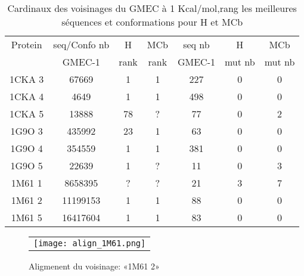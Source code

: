     \begin{table}[h]
      \centering

      \begin{tabular}{ccccccc}


        \toprule
        Protein & seq/Confo nb  & H      & MCb   & seq nb  & H  & MCb  \\
                &     GMEC-1    &  rank &  rank & GMEC-1  & mut nb & mut nb \\
        \cmidrule{1-7}
        1CKA 3 & 67669    & 1  & 1 & 227  & 0 & 0 \\
        1CKA 4 & 4649     & 1  & 1 & 498  & 0 & 0 \\
        1CKA 5 & 13888    & 78 & ? & 77   & 0 & 2 \\
        1G9O 3 & 435992   & 23 & 1 & 63   & 0 & 0 \\
        1G9O 4 & 354559   & 1  & 1 & 381  & 0 & 0 \\
        1G9O 5 & 22639    & 1  & ? &  11  & 0 & 3 \\
        1M61 1 & 8658395  & ?  & ? & 21   & 3 & 7 \\
        1M61 2 & 11199153 & 1  & 1 & 88   & 0 & 0 \\
        1M61 5 & 16417604 & 1  & 1 & 83   & 0 & 0 \\
        \bottomrule
      \end{tabular} 
 \caption{Cardinaux  des voisinages du GMEC à 1 Kcal/mol,rang les meilleures séquences et conformations pour H et MCb}
\label{tab:etude_au_voisinnage}           
\end{table}

    \begin{figure}[h]
      \centering
      \begin{tabular}{c} 
        \texttt{[image: align\_1M61.png]} 
      \end{tabular}
      
      \caption{Aligmenent du voisinage: «1M61 2»}
\label{image:Align_Suboptimal}
    \end{figure}


